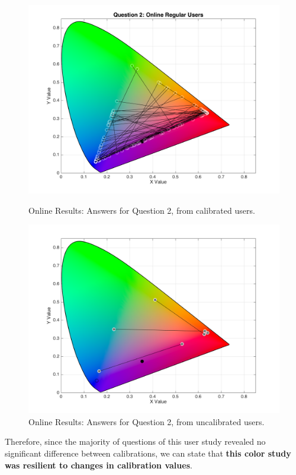 \begin{figure}[!htbp]
  \centering
  \begin{minipage}{0.48\textwidth}
    \centering
    \includegraphics[width=\textwidth]{images/results/2_online_regularUsers.png}
    \caption[Online Results: Answers for Question 2, from calibrated users.]{Online Results: Answers for Question 2, from calibrated users.}
    \label{fig:uncal_1}
  \end{minipage}\hfill
  \begin{minipage}{0.48\textwidth}
    \centering
    \includegraphics[width=\textwidth]{images/results/2_online_uncalibratedUsers.png}
    \caption[Online Results: Answers for Question 2, from uncalibrated users.]{Online Results: Answers for Question 2, from uncalibrated users.}
    \label{fig:uncal_2}
  \end{minipage}
\end{figure} \par
%
Therefore, since the majority of questions of this user study revealed no significant difference between calibrations, we can state that \textbf{this color study was resilient to changes in calibration values}.
%
